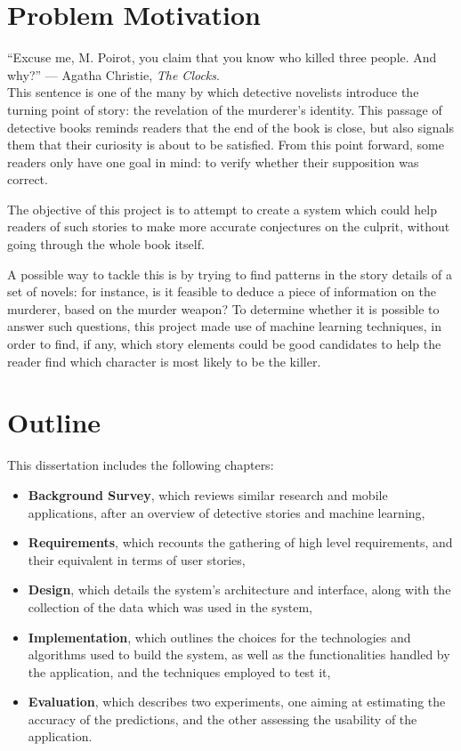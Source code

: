 \documentclass{mproj}
\begin{document}
\section{Problem Motivation}

``Excuse me, M. Poirot, you claim that you know who killed three people. And why?'' --- Agatha Christie, \textit{The Clocks}.\\ 
This sentence is one of the many by which detective novelists introduce the turning point of story: the revelation of the murderer's identity. This passage of detective books reminds readers that the end of the book is close, but also signals them that their curiosity is about to be satisfied. From this point forward, some readers only have one goal in mind: to verify whether their supposition was correct.

The objective of this project is to attempt to create a system which could help readers of such stories to make more accurate conjectures on the culprit, without going through the whole book itself. 

A possible way to tackle this is by trying to find patterns in the story details of a set of novels: for instance, is it feasible to deduce a piece of information on the murderer, based on the murder weapon? To determine whether it is possible to answer such questions, this project made use of machine learning techniques, in order to find, if any, which story elements could be good candidates to help the reader find which character is most likely to be the killer.

\section{Outline}

This dissertation includes the following chapters: 
\begin{itemize}
	\item \textbf{Background Survey}, which reviews similar research and mobile applications, after an overview of detective stories and machine learning,
	\item \textbf{Requirements}, which recounts the gathering of high level requirements, and their equivalent in terms of user stories,
	\item \textbf{Design}, which details the system's architecture and interface, along with the collection of the data which was used in the system,
	\item \textbf{Implementation}, which outlines the choices for the technologies and algorithms used to build the system, as well as the functionalities handled by the application, and the techniques employed to test it,
	\item \textbf{Evaluation}, which describes two experiments, one aiming at estimating the accuracy of the predictions, and the other assessing the usability of the application.
\end{itemize}
\end{document}
